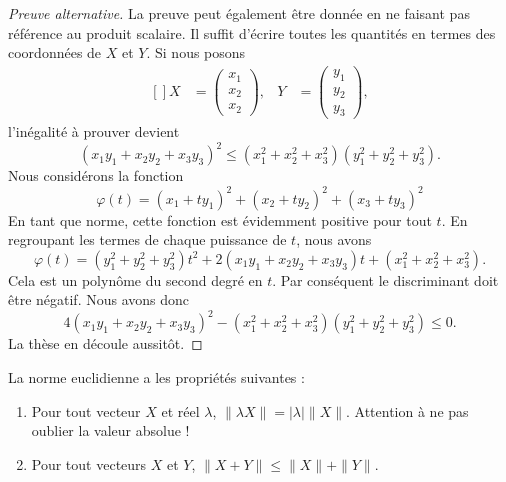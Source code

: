 \begin{proof}[Preuve alternative]
	La preuve peut également être donnée en ne faisant pas référence au produit scalaire. Il suffit d'écrire toutes les quantités en termes des coordonnées de $X$ et $Y$. Si nous posons
	\begin{equation}
		\begin{aligned}[]
			X&=\begin{pmatrix}
				x_1	\\
				x_2	\\
				x_2
			\end{pmatrix},
			&Y&=\begin{pmatrix}
				y_1	\\
				y_2	\\
				y_3
			\end{pmatrix},
		\end{aligned}
	\end{equation}
	l'inégalité à prouver devient
	\begin{equation}
		(x_1y_1+x_2y_2+x_3y_3)^2\leq (x_1^2+x_2^2+x_3^2)(y_1^2+y_2^2+y_3^2).
	\end{equation}
	Nous considérons la fonction
	\begin{equation}
		\varphi(t)=(x_1+ty_1)^2+(x_2+ty_2)^2+(x_3+ty_3)^2
	\end{equation}
	En tant que norme, cette fonction est évidemment positive pour tout $t$. En regroupant les termes de chaque puissance de $t$, nous avons
	\begin{equation}
		\varphi(t)=(y_1^2+y_2^2+y_3^2)t^2+2(x_1y_1+x_2y_2+x_3y_3)t+(x_1^2+x_2^2+x_3^2).
	\end{equation}
	Cela est un polynôme du second degré en $t$. Par conséquent le discriminant doit être négatif. Nous avons donc
	\begin{equation}
		4(x_1y_1+x_2y_2+x_3y_3)^2-(x_1^2+x_2^2+x_3^2)(y_1^2+y_2^2+y_3^2)\leq 0.
	\end{equation}
	La thèse en découle aussitôt.
\end{proof}

\begin{proposition}     \label{PROPooVSVMooZrqxdc}
	La norme euclidienne a les propriétés suivantes :
	\begin{enumerate}
		\item
			Pour tout vecteur $X$ et réel $\lambda$,  $\| \lambda X \|=| \lambda |\| X \|$. Attention à ne pas oublier la valeur absolue !
		\item
			Pour tout vecteurs $X$ et $Y$, $\| X+Y \|\leq \| X \|+\| Y \|$.
	\end{enumerate}
\end{proposition}

